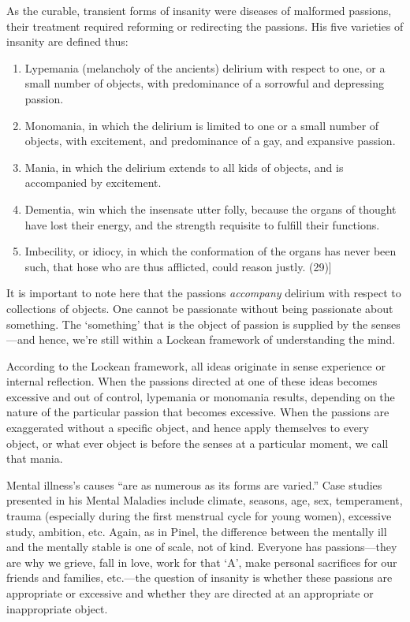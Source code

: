 As the curable, transient forms of insanity were diseases of malformed passions, their treatment required reforming or redirecting the passions. His five varieties of insanity are defined thus:

\begin{enumerate}
\item Lypemania (melancholy of the ancients) delirium with respect to one, or a small number of objects, with predominance of a sorrowful and depressing passion.

\item Monomania, in which the delirium is limited to one or a small number of objects, with excitement, and predominance of a gay, and expansive passion.

\item Mania, in which the delirium extends to all kids of objects, and is accompanied by excitement.

\item Dementia, win which the insensate utter folly, because the organs of thought have lost their energy, and the strength requisite to fulfill their functions.

\item Imbecility, or idiocy, in which the conformation of the organs has never been such, that hose who are thus afflicted, could reason justly. (29)]

\end{enumerate}

It is important to note here that the passions \emph{accompany} delirium with respect to collections of objects. One cannot be passionate without being passionate about something. The `something' that is the object of passion is supplied by the senses---and hence, we're still within a Lockean framework of understanding the mind. 

According to the Lockean framework, all ideas originate in sense experience or internal reflection. When the passions directed at one of these ideas becomes excessive and out of control, lypemania or monomania results, depending on the nature of the particular passion that becomes excessive. When the passions are exaggerated without a specific object, and hence apply themselves to every object, or what ever object is before the senses at a particular moment, we call that mania.

Mental illness's causes ``are as numerous as its forms are varied.'' Case studies presented in his Mental Maladies include climate, seasons, age, sex, temperament, trauma (especially during the first menstrual cycle for young women), excessive study, ambition, etc. Again, as in Pinel, the difference between the mentally ill and the mentally stable is one of scale, not of kind. Everyone has passions---they are why we grieve, fall in love, work for that `A', make personal sacrifices for our friends and families, etc.---the question of insanity is whether these passions are appropriate or excessive and whether they are directed at an appropriate or inappropriate object.

